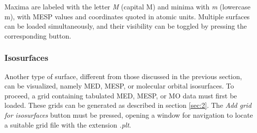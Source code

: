 \documentclass[10pt]{article}
\begin{document}
Maxima are labeled with the letter {\it M} (capital M) and minima with {\it m} (lowercase m),
with MESP values and coordinates quoted in atomic units.
Multiple surfaces can be loaded simultaneously, and their visibility can be toggled by pressing the
corresponding button.


\subsubsection{Isosurfaces \label{sec:4.13.10}}

Another type of surface, different from those discussed in the previous section, can be visualized, 
namely MED, MESP, 
or molecular orbital isosurfaces. 
To proceed, a grid containing tabulated MED, MESP, or MO data must first be loaded. 
These grids can be generated as described in section \ref{sec:2}. 
The {\it Add grid for isosurfaces} button must be pressed, opening a window for 
navigation to locate a suitable grid file with the extension {\it .plt}.
\end{document}
